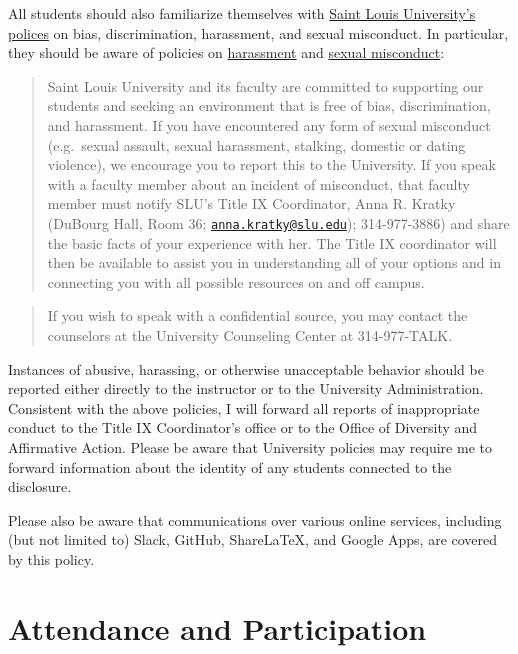 \documentclass[]{book}
\theoremstyle{definition}
\theoremstyle{definition}
\theoremstyle{definition}
\theoremstyle{remark}
\begin{document}
All students should also familiarize themselves with
\href{http://www.slu.edu/general-counsel-home/office-of-institutional-equity-and-diversity}{Saint
Louis University's polices} on bias, discrimination, harassment, and
sexual misconduct. In particular, they should be aware of policies on
\href{https://www.slu.edu/general-counsel/institutional-equity-diversity/pdfs/harassment-policy.pdf}{harassment}
and
\href{https://www.slu.edu/about/safety/sexual-assault-resources.php}{sexual
misconduct}:

\begin{quote}
Saint Louis University and its faculty are committed to supporting our
students and seeking an environment that is free of bias,
discrimination, and harassment. If you have encountered any form of
sexual misconduct (e.g.~sexual assault, sexual harassment, stalking,
domestic or dating violence), we encourage you to report this to the
University. If you speak with a faculty member about an incident of
misconduct, that faculty member must notify SLU's Title IX Coordinator,
Anna R. Kratky (DuBourg Hall, Room 36;
\href{mailto:anna.kratky@slu.edu}{\nolinkurl{anna.kratky@slu.edu}});
314-977-3886) and share the basic facts of your experience with her. The
Title IX coordinator will then be available to assist you in
understanding all of your options and in connecting you with all
possible resources on and off campus.
\end{quote}

\begin{quote}
If you wish to speak with a confidential source, you may contact the
counselors at the University Counseling Center at 314-977-TALK.
\end{quote}

Instances of abusive, harassing, or otherwise unacceptable behavior
should be reported either directly to the instructor or to the
University Administration. Consistent with the above policies, I will
forward all reports of inappropriate conduct to the Title IX
Coordinator's office or to the Office of Diversity and Affirmative
Action. Please be aware that University policies may require me to
forward information about the identity of any students connected to the
disclosure.

Please also be aware that communications over various online services,
including (but not limited to) Slack, GitHub, ShareLaTeX, and Google
Apps, are covered by this policy.

\section{Attendance and
Participation}\label{attendance-and-participation}
\end{document}
